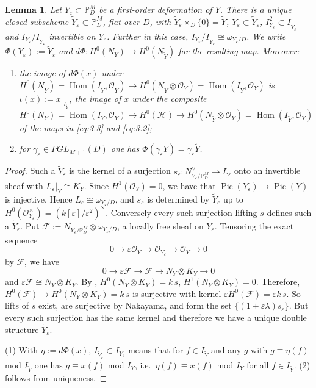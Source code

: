 \documentclass[11pt,twoside]{amsart}
\theoremstyle{plain}
\newtheorem{lemma}[theorem]{Lemma}
\theoremstyle{definition}
\newcommand{\PM}{\mathbb{P}^M}
\newcommand{\OO}{\mathcal{O}}
\newcommand{\Yt}{\widetilde{Y}}
\newcommand{\NY}{N_{Y}}
\newcommand{\NYt}{N_{\Yt}}
\newcommand{\Hc}{\mathcal{H}}
\newcommand{\Dd}{D}
\begin{document}
\begin{lemma}\label{lem:Phi}
Let $Y_\varepsilon\subset\PM_\Dd$ be a first-order deformation of $Y$. There is a unique closed subscheme $\Yt_\varepsilon\subset\PM_\Dd$, flat over $\Dd$, with $\Yt_\varepsilon\times_\Dd\{0\}=\Yt$, $Y_\varepsilon\subset\Yt_\varepsilon$, $I_{Y_\varepsilon}^2\subset I_{\Yt_\varepsilon}$ and $I_{Y_\varepsilon}/I_{\Yt_\varepsilon}$ invertible on $Y_\varepsilon$. Further in this case, $I_{Y_\varepsilon}/I_{\Yt_\varepsilon} \cong \omega_{Y_{\varepsilon}/D}$.  We write $\Phi(Y_\varepsilon):=\Yt_\varepsilon$ and $d\Phi\colon H^0(\NY)\to H^0(\NYt)$ for the resulting map. Moreover:
\begin{enumerate}
\item the image of $d\Phi(x)$ under $H^0(\NYt) = \operatorname{Hom}(I_{\widetilde Y}, \mathcal O_{\widetilde Y})\to H^0(\NYt\otimes\OO_Y) = \operatorname{Hom}(I_{\widetilde Y}, \mathcal O_{Y})$ is $\iota(x):=x|_{I_{\Yt}}$, the image of $x$ under the composite $H^0(\NY) = \operatorname{Hom}(I_{Y}, \mathcal O_{Y})\to H^0(\Hc)\to H^0(\NYt\otimes\OO_Y) = \operatorname{Hom}(I_{\widetilde Y}, \mathcal O_{Y})$ of the maps in \eqref{eq:3.3} and \eqref{eq:3.2};
\item for $\gamma_\varepsilon\in PGL_{M+1}(\Dd)$ one has $\Phi(\gamma_\varepsilon Y)=\gamma_\varepsilon\Yt$.
\end{enumerate}
\end{lemma}

\begin{proof}
Such a $\Yt_\varepsilon$ is the kernel of a surjection $s_\varepsilon\colon N_{Y_\varepsilon/\PM_\Dd}^{\vee}\to L_\varepsilon$ onto an invertible sheaf with $L_\varepsilon|_Y\cong K_Y$. Since $H^1(\mathcal{O}_Y) = 0$, we have that $\operatorname{Pic}(Y_\varepsilon)\to\operatorname{Pic}(Y)$ is injective. Hence  $L_\varepsilon\cong\omega_{Y_\varepsilon/\Dd}$, and $s_\varepsilon$ is determined by $\Yt_\varepsilon$ up to $H^0(\OO_{Y_\varepsilon}^{\times})=(k[\varepsilon]/\varepsilon^2)^{\times}$. Conversely every such surjection lifting $s$ defines such a $\Yt_\varepsilon$. Put $\mathcal{F}:=N_{Y_\varepsilon/\PM_\Dd}\otimes\omega_{Y_\varepsilon/\Dd}$, a locally free sheaf on $Y_\varepsilon$. Tensoring the exact sequence 
$$0 \to \varepsilon \mathcal{O}_Y \to \mathcal{O}_{Y_{\varepsilon}} \to \mathcal{O}_Y \to 0$$
by $\mathcal F$, we have $$0\to\varepsilon\mathcal{F}\to\mathcal{F}\to\NY\otimes K_Y\to 0$$ 
and $\varepsilon\mathcal{F}\cong\NY\otimes K_Y$. By , $H^0(\NY\otimes K_Y)=k\,s$,  $H^1(\NY\otimes K_Y)=0$. Therefore, $H^0(\mathcal{F})\to H^0(\NY\otimes K_Y)=k\,s$ is surjective with kernel $\varepsilon H^0(\mathcal{F})=\varepsilon k\,s$. So lifts of $s$ exist, are surjective by Nakayama, and form the set $\{(1+\varepsilon\lambda)s_\varepsilon\}$. But every such surjection has the same kernel and therefore we have a unique double structure $\widetilde{Y}_{\varepsilon}$.

(1) With $\eta:=d\Phi(x)$, $I_{\Yt_\varepsilon}\subset I_{Y_\varepsilon}$ means that for $f\in I_{\Yt}$ and any $g$ with $g\equiv\eta(f)$ mod $I_{\Yt}$ one has $g\equiv x(f)$ mod $I_Y$, i.e.\ $\eta(f)\equiv x(f)$ mod $I_Y$ for all $f\in I_{\Yt}$. (2) follows from uniqueness.
\end{proof}
\end{document}

